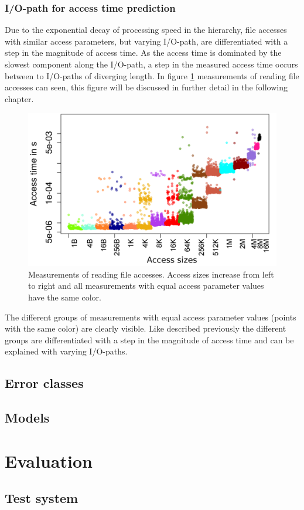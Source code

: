 \documentclass{superfri}
\begin{document}
\subsubsection{I/O-path for access time prediction}
Due to the exponential decay of processing speed in the hierarchy, file accesses with similar access parameters, but varying I/O-path, are differentiated with a step in the magnitude of access time.
As the access time is dominated by the slowest component along the I/O-path, a step in the measured access time occurs between to I/O-paths of diverging length.
In figure \ref{fig:io_paths} measurements of reading file accesses can seen, this figure will be discussed in further detail in the following chapter.
\begin{figure}
	\centering
	\includegraphics[width=.47\textwidth]{src/plot_SizeSorted_log_read_seq.png}
	\caption{Measurements of reading file accesses. Access sizes increase from left to right and all measurements with equal access parameter values have the same color.}
	\label{fig:io_paths}
\end{figure} 
The different groups of measurements with equal access parameter values (points with the same color) are clearly visible.
Like described previously the different groups are differentiated with a step in the magnitude of access time and can be explained with varying I/O-paths.

\subsection{Error classes}

\subsection{Models}

\section{Evaluation}

\subsection{Test system}
\end{document}
